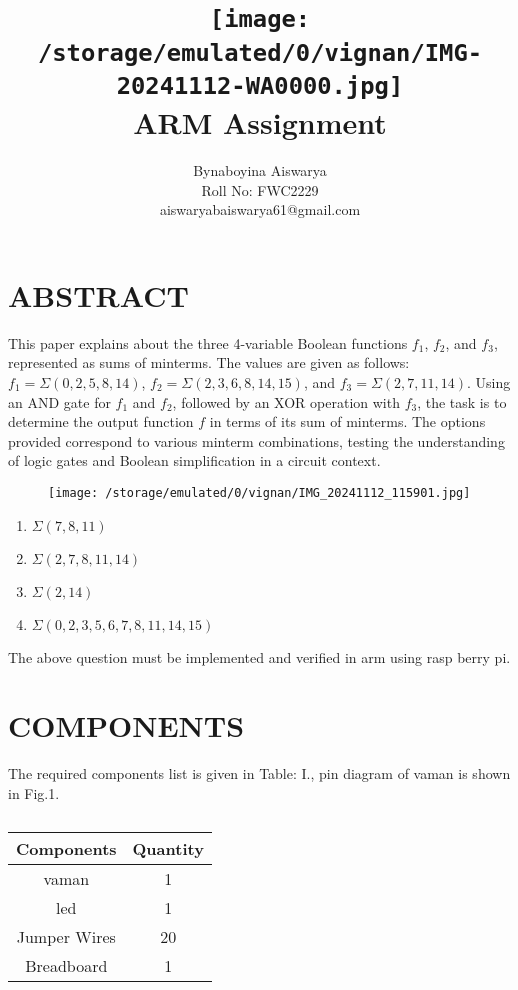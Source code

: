 \documentclass[conference]{IEEEtran}
\title{
\vspace{1cm}
{\texttt{[image:  
/storage/emulated/0/vignan/IMG-20241112-WA0000.jpg]} \\ ARM Assignment}}
\author{Bynaboyina Aiswarya \\ Roll No: FWC2229 \\ aiswaryabaiswarya61@gmail.com}
\begin{document}
\maketitle
 \section{ABSTRACT}

This paper explains about the three 4-variable Boolean functions $f_1$, $f_2$, and $f_3$, represented as sums of minterms. The values are given as follows: $f_1 = \Sigma (0, 2, 5, 8, 14)$, $f_2 = \Sigma (2, 3, 6, 8, 14, 15)$, and  $f_3 = \Sigma (2, 7, 11, 14)$. Using an AND gate for $f_1$ and $f_2$, followed by an XOR operation with $f_3$, the task is to determine the output function $f$ in terms of its sum of minterms. The options provided correspond to various minterm combinations, testing the understanding of logic gates and Boolean simplification in a circuit context.

\begin{figure}[h]                         
\centering                                
\texttt{[image:  /storage/emulated/0/vignan/IMG\_20241112\_115901.jpg]}                               
\caption{\label{fig-1:Gates}}             
\end{figure}


 \begin{enumerate}
	 \item $\Sigma (7,8,11)$
	 \item $\Sigma (2,7,8,11,14)$
	 \item $\Sigma (2,14)$
	 \item $\Sigma (0,2,3,5,6,7,8,11,14,15)$
 \end{enumerate}

The above question must be implemented and verified in arm using rasp berry pi.


\section{COMPONENTS} 

The required components list is given in Table: I., pin diagram of vaman is shown in Fig.1.
\vspace{0.3cm}
 \begin{table} [htbp]
\centering
\begin{tabular}{| c | c |} \hline
Components  & Quantity \\\hline
vaman   & 1 \\ \hline
led  & 1 \\ \hline
Jumper Wires   & 20 \\ \hline
Breadboard & 1 \\ 
\hline
\end{tabular}
\vspace{0.1cm}
\caption{\label{tab:widgets}}
\end{table}
\end{document}
